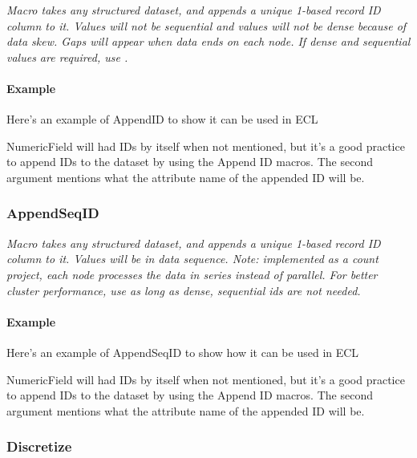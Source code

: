 \textit{Macro takes any structured dataset, and appends a unique 1-based record ID column to it. Values will not be sequential and values will not be dense because of data skew. Gaps will appear when data ends on each node. If dense and sequential values are required, use .}

\paragraph{Example}

Here's an example of AppendID to show it can be used in ECL



NumericField will had IDs by itself when not mentioned, but it's a good practice to append IDs to the dataset by using the Append ID macros. The second argument mentions what the attribute name of the appended ID will be.

\subsubsection{AppendSeqID}\label{mlcore:appendseqid}

\textit{Macro takes any structured dataset, and appends a unique 1-based record ID column to it. Values will be in data sequence. Note: implemented as a count project, each node processes the data in series instead of parallel. For better cluster performance, use  as long as dense, sequential ids are not needed.}

\paragraph{Example}

Here's an example of AppendSeqID to show how it can be used in ECL



NumericField will had IDs by itself when not mentioned, but it's a good practice to append IDs to the dataset by using the Append ID macros. The second argument mentions what the attribute name of the appended ID will be.

\subsubsection{Discretize}\label{mlcore:discretize}

